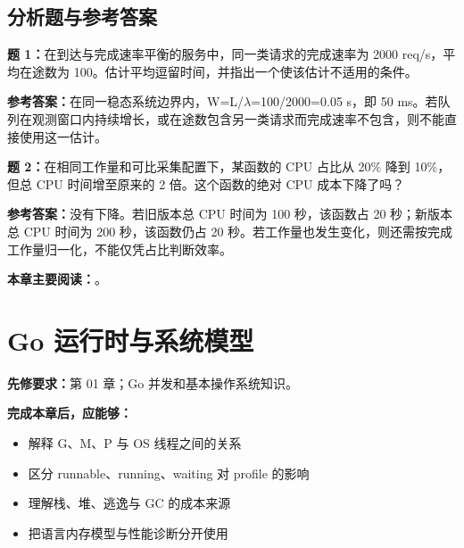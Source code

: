 \documentclass[UTF8,fontset=fandol,openany,11pt]{ctexbook}
\begin{document}
\section{分析题与参考答案}
\noindent\textbf{题 1：}在到达与完成速率平衡的服务中，同一类请求的完成速率为 2000 req/s，平均在途数为 100。估计平均逗留时间，并指出一个使该估计不适用的条件。

\noindent\textbf{参考答案：}在同一稳态系统边界内，W=L/\ensuremath{\lambda}=100/2000=0.05 s，即 50 ms。若队列在观测窗口内持续增长，或在途数包含另一类请求而完成速率不包含，则不能直接使用这一估计。

\noindent\textbf{题 2：}在相同工作量和可比采集配置下，某函数的 CPU 占比从 20\% 降到 10\%，但总 CPU 时间增至原来的 2 倍。这个函数的绝对 CPU 成本下降了吗？

\noindent\textbf{参考答案：}没有下降。若旧版本总 CPU 时间为 100 秒，该函数占 20 秒；新版本总 CPU 时间为 200 秒，该函数仍占 20 秒。若工作量也发生变化，则还需按完成工作量归一化，不能仅凭占比判断效率。

\medskip\noindent\textbf{本章主要阅读：}\cite{go-diagnostics}。
\chapter{Go 运行时与系统模型}
\label{ch:02}
\par\medskip
\noindent\textbf{先修要求：}第 01 章；Go 并发和基本操作系统知识。

\noindent\textbf{完成本章后，应能够：}
\begin{itemize}
\item 解释 G、M、P 与 OS 线程之间的关系
\item 区分 runnable、running、waiting 对 profile 的影响
\item 理解栈、堆、逃逸与 GC 的成本来源
\item 把语言内存模型与性能诊断分开使用
\end{itemize}
\end{document}
